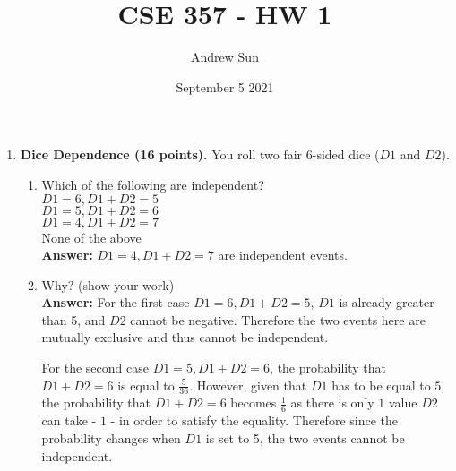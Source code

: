 \documentclass[12pt, letterpaper, twoside]{article}
\title{CSE 357 - HW 1}
\author{Andrew Sun}
\date{September 5 2021}
\begin{document}
	\begin{titlepage}
		\maketitle
	\end{titlepage}
	\begin{enumerate}
		\item \textbf{Dice Dependence (16 points).} You roll two fair
		6-sided dice ($D1$ and $D2$).
		\begin{enumerate}
			\item Which of the following are independent?\\
			$D1=6,D1+D2=5$\\
			$D1=5,D1+D2=6$\\
			$D1=4,D1+D2=7$\\
			None of the above\\
			\textbf{Answer:} $D1=4,D1+D2=7$ are independent events.
			\item Why? (show your work)\\
			\textbf{Answer:} For the first case $D1=6, D1+D2=5$, $D1$ is already
			greater than 5, and $D2$ cannot be negative. Therefore the two events
			here are mutually exclusive and thus cannot be independent.
			
			For the second case $D1=5,D1+D2=6$, the probability that $D1+D2=6$ is
			equal to $\frac{5}{36}$. However, given that $D1$ has to be equal to $5$,
			the probability that $D1+D2=6$ becomes $\frac{1}{6}$ as there is only
			$1$ value $D2$ can take - $1$ - in order to satisfy the equality.
			Therefore since the probability changes when $D1$ is set to 5,
			the two events cannot be independent.
			

\end{enumerate}
\end{enumerate}
\end{document}

